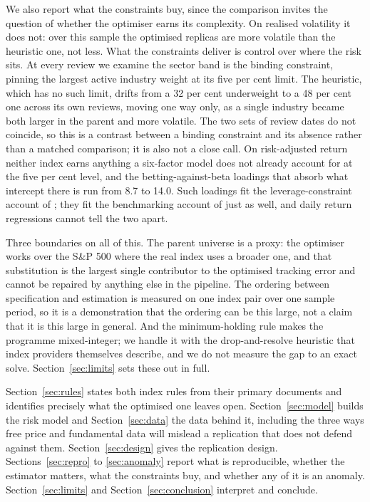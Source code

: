 We also report what the constraints buy, since the comparison invites the
question of whether the optimiser earns its complexity. On realised volatility
it does not: over this sample the optimised replicas are more volatile than the
heuristic one, not less. What the constraints deliver is control over where the
risk sits. At every review we examine the sector band is the binding
constraint, pinning the largest active industry weight at its five per cent
limit. The heuristic, which has no such limit, drifts from a 32 per cent
underweight to a 48 per cent one across its own reviews, moving one way only,
as a single industry became both larger in the parent and more volatile. The
two sets of review dates do not coincide, so this is a contrast between a
binding constraint and its absence rather than a matched comparison; it is also
not a close call. On risk-adjusted return neither index earns anything a
six-factor model does not already account for at the five per cent level, and
the betting-against-beta loadings that absorb what intercept there is run from
8.7 to 14.0. Such loadings fit the leverage-constraint account of
\citet{frazzini2014betting}; they fit the benchmarking account of
\citet{baker2011benchmarks} just as well, and daily return regressions cannot
tell the two apart.

Three boundaries on all of this. The parent universe is a proxy: the optimiser
works over the S\&P 500 where the real index uses a broader one, and that
substitution is the largest single contributor to the optimised tracking error
and cannot be repaired by anything else in the pipeline. The ordering between
specification and estimation is measured on one index pair over one sample
period, so it is a demonstration that the ordering can be this large, not a
claim that it is this large in general. And the minimum-holding rule makes the
programme mixed-integer; we handle it with the drop-and-resolve heuristic that
index providers themselves describe, and we do not measure the gap to an exact
solve. Section~\ref{sec:limits} sets these out in full.

Section~\ref{sec:rules} states both index rules from their primary documents and
identifies precisely what the optimised one leaves open.
Section~\ref{sec:model} builds the risk model and Section~\ref{sec:data} the
data behind it, including the three ways free price and fundamental data will
mislead a replication that does not defend against them.
Section~\ref{sec:design} gives the replication design.
Sections~\ref{sec:repro} to \ref{sec:anomaly} report what is reproducible,
whether the estimator matters, what the constraints buy, and whether any of it
is an anomaly. Section~\ref{sec:limits} and Section~\ref{sec:conclusion}
interpret and conclude.
